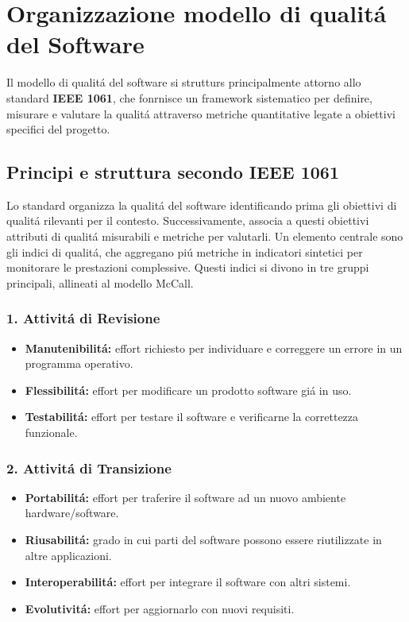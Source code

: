 \documentclass[11pt]{article}
\begin{document}
\section{Organizzazione modello di qualitá del Software}
\label{sec:org183db70}
Il modello di qualitá del software si strutturs principalmente attorno allo standard \textbf{\textbf{IEEE 1061}}, che fonrnisce un framework sistematico per definire, misurare e valutare la qualitá attraverso metriche quantitative legate a obiettivi specifici del progetto.
\subsection{Principi e struttura secondo IEEE 1061}
\label{sec:orgdb73d8f}
Lo standard organizza la qualitá del software identificando prima gli obiettivi di qualitá rilevanti per il contesto.
Successivamente, associa a questi obiettivi attributi di qualitá misurabili e metriche per valutarli.
Un elemento centrale sono gli indici di qualitá, che aggregano piú metriche in indicatori sintetici per monitorare le prestazioni complessive.
Questi indici si divono in tre gruppi principali, allineati al modello McCall.
\subsubsection{1. Attivitá di Revisione}
\label{sec:org7c34068}
\begin{itemize}
\item \textbf{\textbf{Manutenibilitá:}} effort richiesto per individuare e correggere un errore in un programma operativo.
\item \textbf{\textbf{Flessibilitá:}} effort per modificare un prodotto software giá in uso.
\item \textbf{\textbf{Testabilitá:}} effort per testare il software e verificarne la correttezza funzionale.
\end{itemize}
\subsubsection{2. Attivitá di Transizione}
\label{sec:org9003b05}
\begin{itemize}
\item \textbf{\textbf{Portabilitá:}} effort per traferire il software ad un nuovo ambiente hardware/software.
\item \textbf{\textbf{Riusabilitá:}} grado in cui parti del software possono essere riutilizzate in altre applicazioni.
\item \textbf{\textbf{Interoperabilitá:}} effort per integrare il software con altri sistemi.
\item \textbf{\textbf{Evolutivitá:}} effort per aggiornarlo con nuovi requisiti.
\end{itemize}
\end{document}
